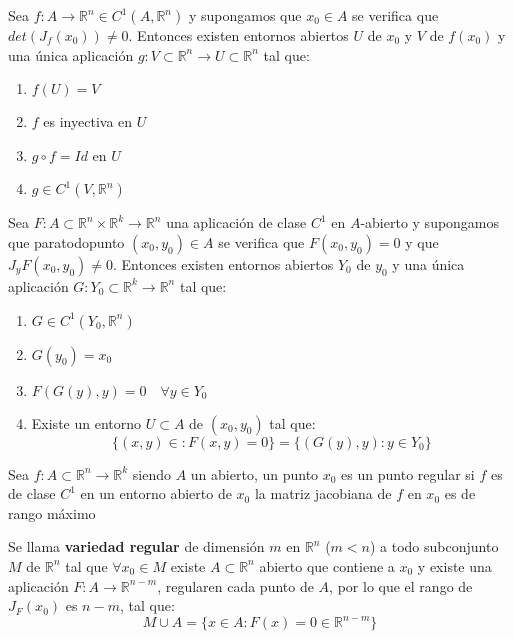 \begin{teorema}
    Sea $f: A \to \mathbb{R}^n \in C^1(A, \mathbb{R}^n)$ y supongamos que $x_0 \in A$ se verifica que $det(J_f(x_0)) \neq 0$. Entonces existen entornos abiertos $U$ de $x_0$ y $V$ de $f(x_0)$ y una única aplicación $g: V \subset \mathbb{R}^n \to U \subset \mathbb{R}^n$ tal que:
    \begin{enumerate}
        \item $f(U) = V$
        \item $f$ es inyectiva en $U$
        \item $g \circ f = Id$ en $U$
        \item $g \in C^1(V, \mathbb{R}^n)$
    \end{enumerate}
\end{teorema}

\begin{teorema}
    Sea $F: A \subset \mathbb{R}^n \times \mathbb{R}^k \to \mathbb{R}^n$ una aplicación de clase $C^1$ en $A$-abierto y supongamos que paratodopunto $(x_0, y_0) \in A$ se verifica que $F(x_0, y_0) = 0$ y que $J_yF(x_0, y_0) \neq 0$. Entonces existen entornos abiertos $Y_0$ de $y_0$ y una única aplicación $G: Y_0 \subset \mathbb{R}^k \to \mathbb{R}^n$ tal que:
    \begin{enumerate}
        \item $G \in C^1(Y_0, \mathbb{R}^n)$
        \item $G(y_0) = x_0$
        \item $F(G(y), y) = 0 \quad \forall y \in Y_0$
        \item Existe un entorno $U \subset A$ de $(x_0, y_0)$ tal que: 
        $$\{(x, y) \in : F(x,y) = 0\}= \{(G(y), y) : y \in Y_0\}$$
    \end{enumerate}
\end{teorema}

\begin{definición}
    Sea $f: A \subset \mathbb{R}^n \to \mathbb{R}^k$ siendo $A$ un abierto, un punto $x_0$ es un punto regular si $f$ es de clase $C^1$ en un entorno abierto de $x_0$  la matriz jacobiana de $f$ en $x_0$ es de rango máximo
\end{definición}

\begin{definición}
    Se llama \textbf{variedad regular} de dimensión $m$ en $\mathbb{R}^n$ ($m < n$) a todo subconjunto $M$ de $\mathbb{R}^n$ tal que $\forall x_0 \in M$ existe $A \subset \mathbb{R}^n$ abierto  que contiene a $x_0$ y existe una aplicación $F: A \to \mathbb{R}^{n-m}$, regularen cada punto de $A$, por lo que el rango de $J_F(x_0)$ es $n-m$, tal que:
    $$M \cup A = \{x \in A : F(x) = 0 \in \mathbb{R}^{n-m}\}$$
\end{definición}

